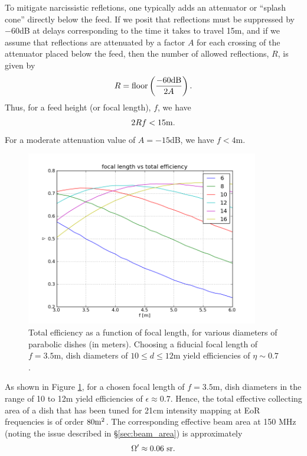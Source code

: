 \documentclass[11pt]{article}
\begin{document}
To mitigate narcissistic refletions, one typically adds an attenuator or ``splash cone'' directly below the feed.
If we posit that reflections must be suppressed by $-60$dB at delays corresponding to the time it takes
to travel 15m, and if we assume that reflections are attenuated by a factor $A$ for each crossing of the
attenuator placed below the feed, then the number of allowed reflections, $R$, is given by
\begin{equation}
R={\rm floor}\left(\frac{-60{\rm dB}}{2A}\right).
\end{equation}
Thus, for a feed height (or focal length), $f$, we have
\begin{equation}
2Rf<15{\rm m}.
\end{equation}
For a moderate attenuation value of $A=-15$dB, we have $f<4$m.

\begin{figure}
\centering
\includegraphics[width=4in]{plots/focal_len_vs_eff.png}
\caption{Total efficiency as a function of focal length, for various diameters of parabolic dishes (in meters).
Choosing a fiducial focal length of $f=3.5$m, dish diameters of $10\le d\le 12$m yield efficiencies of
$\eta\sim0.7$.}
\label{fig:focal_len_vs_eff}
\end{figure}

As shown in Figure \ref{fig:focal_len_vs_eff}, for a chosen focal length of $f=3.5$m, dish diameters in the
range of 10 to 12m yield efficiencies of $\epsilon\approx0.7$.  Hence, the total effective collecting area
of a dish that has been tuned for 21cm intensity mapping at EoR frequencies is of order $80{\rm m}^2$.  The
corresponding effective beam area at 150 MHz 
(noting the issue described in \S\ref{sec:beam_area}) is approximately
\begin{equation}
\Omega^\prime\approx0.06\ {\rm sr}.
\end{equation}
\end{document}
